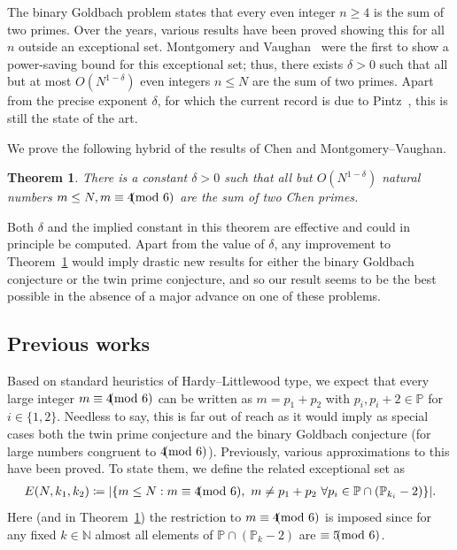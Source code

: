 \documentclass[12pt]{amsart}
\newtheorem{theorem}{Theorem}[section]
\theoremstyle{definition}
\theoremstyle{remark}
\numberwithin{equation}{section}
\newcommand{\1}{\mathbf{1}}
\let\oldpmod\pmod
\renewcommand{\pmod}[1]{\hspace{-0.12cm}\oldpmod {#1}}
\begin{document}
The binary Goldbach problem states that every even integer $n\geq 4$ is the sum of two primes. Over the years, various results have been proved showing this for all $n$ outside an exceptional set. Montgomery and Vaughan~\cite{mv} were the first to show a power-saving bound for this exceptional set; thus, there exists $\delta>0$ such that all but at most $O(N^{1-\delta})$ even integers $n\leq N$ are the sum of two primes. Apart from the precise exponent $\delta$, for which the current record is due to Pintz~\cite{pintz2018}, this is still the state of the art. 

We prove the following hybrid of the results of Chen and Montgomery--Vaughan.

\begin{theorem} \label{MT1}
	There is a constant $\delta>0$ such that all but $O(N^{1-\delta})$ natural numbers $m\leq N, m\equiv 4 \pmod{6}$ are the sum of two Chen primes.
\end{theorem}
Both $\delta$ and the implied constant in this theorem are effective and could in principle be computed. Apart from the value of $\delta$, any improvement to Theorem~\ref{MT1} would imply drastic new results for either the binary Goldbach conjecture or the twin prime conjecture, and so our result seems to be the best possible in the absence of a major advance on one of these problems. 

\subsection{Previous works}
	
Based on standard heuristics of Hardy--Littlewood type, we expect that every large integer $m\equiv 4\pmod 6$ can be written as $m=p_1+p_2$ with $p_i,p_i+2\in \mathbb{P}$ for $i\in \{1,2\}$. Needless to say, this is far out of reach as it would imply as special cases both the twin prime conjecture and the binary Goldbach conjecture (for large numbers congruent to $4\pmod 6$). Previously, various approximations to this have been proved. To state them, we define the related exceptional set as 
\begin{align*}
	E(N,k_1,k_2)\coloneqq |\{m\leq N: m\equiv 4\pmod 6,\,\, m\neq p_1+p_2\,\, \forall p_i\in \mathbb{P}\cap(\mathbb{P}_{k_i}-2)\}|.
\end{align*}
Here (and in Theorem~\ref{MT1}) the restriction to $m\equiv 4 \pmod 6$ is imposed since for any fixed $k\in \mathbb{N}$ almost all elements of $\mathbb{P}\cap (\mathbb{P}_k-2)$ are $\equiv 5 \pmod 6$. 
\end{document}
